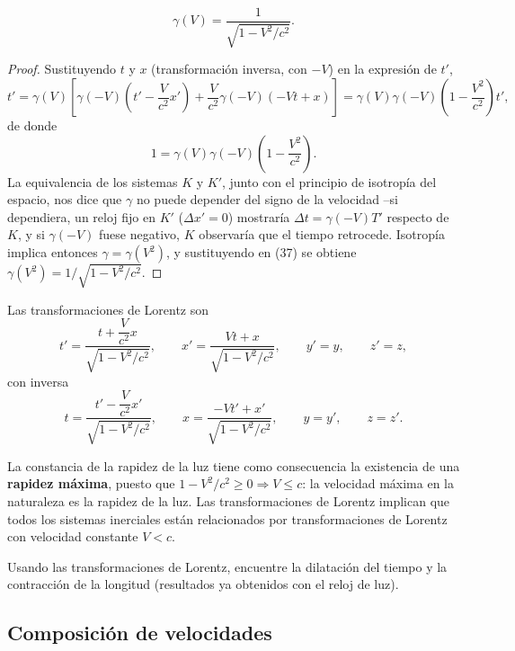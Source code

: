 \begin{proposicionc}
\[
\gamma(V) = \frac{1}{\sqrt{1-V^2/c^2}} .
\]
\end{proposicionc}

\begin{proof}
Sustituyendo $t$ y $x$ (transformación inversa, con $-V$) en la
expresión de $t'$,
\[
t' = \gamma(V)\left[\gamma(-V)\left(t'-\frac{V}{c^2}x'\right) +
\frac{V}{c^2}\gamma(-V)(-Vt+x)\right] = \gamma(V)\gamma(-V)\left(1-
\frac{V^2}{c^2}\right)t',
\]
de donde
\[
1 = \gamma(V)\gamma(-V)\left(1-\frac{V^2}{c^2}\right). \tag{37}
\]
La equivalencia de los sistemas $K$ y $K'$, junto con el principio de
isotropía del espacio, nos dice que $\gamma$ no puede depender del
signo de la velocidad --si dependiera, un reloj fijo en $K'$
($\Delta x'=0$) mostraría $\Delta t=\gamma(-V)T'$ respecto de $K$, y si
$\gamma(-V)$ fuese negativo, $K$ observaría que el tiempo retrocede.
Isotropía implica entonces $\gamma=\gamma(V^2)$, y sustituyendo en (37)
se obtiene $\gamma(V^2) = 1/\sqrt{1-V^2/c^2}$. \qedhere
\end{proof}

\begin{definicion}
Las transformaciones de Lorentz son
\[
t' = \frac{t+\dfrac{V}{c^2}x}{\sqrt{1-V^2/c^2}}, \qquad x' = \frac{Vt+x}
{\sqrt{1-V^2/c^2}}, \qquad y'=y, \qquad z'=z,
\]
con inversa
\[
t = \frac{t'-\dfrac{V}{c^2}x'}{\sqrt{1-V^2/c^2}}, \qquad x =
\frac{-Vt'+x'}{\sqrt{1-V^2/c^2}}, \qquad y=y', \qquad z=z'.
\]
\end{definicion}

La constancia de la rapidez de la luz tiene como consecuencia la
existencia de una \textbf{rapidez máxima}, puesto que
$1-V^2/c^2\ge 0 \Rightarrow V\le c$: la velocidad máxima en la
naturaleza es la rapidez de la luz. Las transformaciones de Lorentz
implican que todos los sistemas inerciales están relacionados por
transformaciones de Lorentz con velocidad constante $V<c$.

\begin{observacion}[Ejercicio]
Usando las transformaciones de Lorentz, encuentre la dilatación del
tiempo y la contracción de la longitud (resultados ya obtenidos con el
reloj de luz).
\end{observacion}

\subsection{Composición de velocidades}

